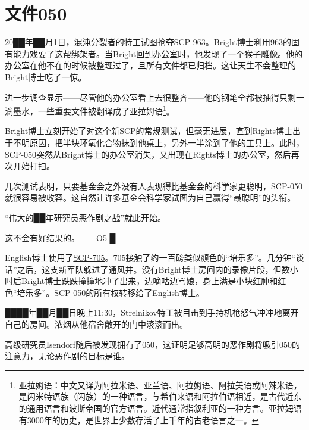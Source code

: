 \section{文件050}

\label{sec:DOC-document-050}


20██年██月1日，混沌分裂者的特工试图抢夺SCP-963。Bright博士利用963的固有能力戏耍了这帮绑架者。当Bright回到办公室时，他发现了一个猴子雕像。他的办公室在他不在的时候被整理过了，且所有文件都已归档。这让天生不会整理的Bright博士吃了一惊。

进一步调查显示——尽管他的办公室看上去很整齐——他的钢笔全都被抽得只剩一滴墨水，一些重要文件被翻译成了亚拉姆语\footnote{亚拉姆语：中文又译为阿拉米语、亚兰语、阿拉姆语、阿拉美语或阿辣米语，是闪米特语族（闪族）的一种语言，与希伯来语和阿拉伯语相近，是古代近东的通用语言和波斯帝国的官方语言。近代通常指叙利亚的一种方言。亚拉姆语有3000年的历史，是世界上少数存活了上千年的古老语言之一。}。

Bright博士立刻开始了对这个新SCP的常规测试，但毫无进展，直到Rights博士出于不明原因，把半块环氧化合物抹到他桌上，另外一半涂到了他的工具上。此时，SCP-050突然从Bright博士的办公室消失，又出现在Rights博士的办公室，然后再次开始打扫。

几次测试表明，只要基金会之外没有人表现得比基金会的科学家更聪明，SCP-050就很容易被收容。这自然让许多基金会科学家试图为自己赢得“最聪明”的头衔。

“伟大的██年研究员恶作剧之战”就此开始。

\hr

这不会有好结果的。——O5-█

\hr



English博士使用了\hyperref[chap:SCP-705]{SCP-705}。705接触了约一百磅类似颜色的“培乐多”。几分钟“谈话”之后，这支新军队躲进了通风井。没有Bright博士房间内的录像片段，但数小时后Bright博士跌跌撞撞地冲了出来，边嘀咕边骂娘，身上满是小块红肿和红色“培乐多”。SCP-050的所有权转移给了English博士。



████年██月██日晚上11:30，Strelnikov特工被目击到手持机枪怒气冲冲地离开自己的房间。浓烟从他宿舍敞开的门中滚滚而出。

高级研究员Isendorf随后被发现拥有了050，这证明足够高明的恶作剧将吸引050的注意力，无论恶作剧的目标是谁。

